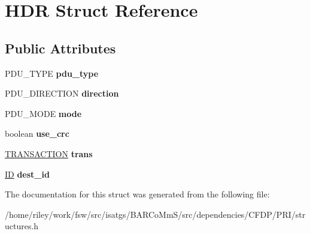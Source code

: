 \hypertarget{struct_h_d_r}{}\section{H\+DR Struct Reference}
\label{struct_h_d_r}
\subsection*{Public Attributes}
\begin{DoxyCompactItemize}
\item 
P\+D\+U\+\_\+\+T\+Y\+PE {\bfseries pdu\+\_\+type}\hypertarget{struct_h_d_r_a975e1aa5feaf254f6538550f780e7a0d}{}\label{struct_h_d_r_a975e1aa5feaf254f6538550f780e7a0d}

\item 
P\+D\+U\+\_\+\+D\+I\+R\+E\+C\+T\+I\+ON {\bfseries direction}\hypertarget{struct_h_d_r_aaf64937ea3f2d84b0f306ba01cdfeeda}{}\label{struct_h_d_r_aaf64937ea3f2d84b0f306ba01cdfeeda}

\item 
P\+D\+U\+\_\+\+M\+O\+DE {\bfseries mode}\hypertarget{struct_h_d_r_a8e1bb4224e30afd6b39d11c2b55f78f8}{}\label{struct_h_d_r_a8e1bb4224e30afd6b39d11c2b55f78f8}

\item 
boolean {\bfseries use\+\_\+crc}\hypertarget{struct_h_d_r_a093c783eee5badd07c8cbb2fa9ab50d4}{}\label{struct_h_d_r_a093c783eee5badd07c8cbb2fa9ab50d4}

\item 
\hyperlink{struct_t_r_a_n_s_a_c_t_i_o_n}{T\+R\+A\+N\+S\+A\+C\+T\+I\+ON} {\bfseries trans}\hypertarget{struct_h_d_r_a98d605a5d88ec09baaf263b5ebd929d7}{}\label{struct_h_d_r_a98d605a5d88ec09baaf263b5ebd929d7}

\item 
\hyperlink{struct_i_d}{ID} {\bfseries dest\+\_\+id}\hypertarget{struct_h_d_r_a6605b4c53823b0ecad9803c18cacb7a9}{}\label{struct_h_d_r_a6605b4c53823b0ecad9803c18cacb7a9}

\end{DoxyCompactItemize}


The documentation for this struct was generated from the following file\+:\begin{DoxyCompactItemize}
\item 
/home/riley/work/fsw/src/isatgs/\+B\+A\+R\+Co\+Mm\+S/src/dependencies/\+C\+F\+D\+P/\+P\+R\+I/structures.\+h\end{DoxyCompactItemize}
